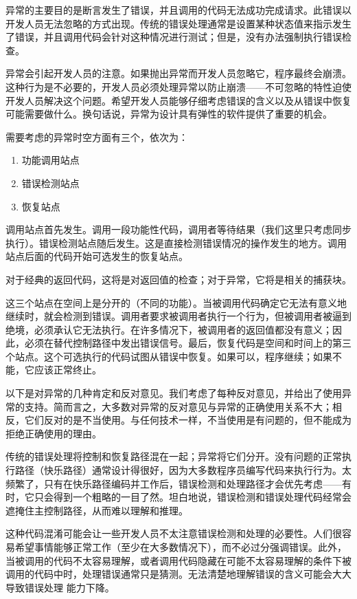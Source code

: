 
异常的主要目的是断言发生了错误，并且调用的代码无法成功完成请求。此错误以开发人员无法忽略的方式出现。传统的错误处理通常是设置某种状态值来指示发生了错误，并且调用代码会针对这种情况进行测试；但是，没有办法强制执行错误检查。

异常会引起开发人员的注意。如果抛出异常而开发人员忽略它，程序最终会崩溃。这种行为是不必要的，开发人员必须处理异常以防止崩溃——不可忽略的特性迫使开发人员解决这个问题。希望开发人员能够仔细考虑错误的含义以及从错误中恢复可能需要做什么。换句话说，异常为设计具有弹性的软件提供了重要的机会。

需要考虑的异常时空方面有三个，依次为：

\begin{enumerate}
\item
功能调用站点

\item
错误检测站点

\item
恢复站点
\end{enumerate}

调用站点首先发生。调用一段功能性代码，调用者等待结果（我们这里只考虑同步执行）。错误检测站点随后发生。这是直接检测错误情况的操作发生的地方。调用站点后面的代码开始可选发生的恢复站点。

对于经典的返回代码，这将是对返回值的检查；对于异常，它将是相关的捕获块。

这三个站点在空间上是分开的（不同的功能）。当被调用代码确定它无法有意义地继续时，就会检测到错误。调用者要求被调用者执行一个行为，但被调用者被逼到绝境，必须承认它无法执行。在许多情况下，被调用者的返回值都没有意义；因此，必须在替代控制路径中发出错误信号。最后，恢复代码是空间和时间上的第三个站点。这个可选执行的代码试图从错误中恢复。如果可以，程序继续；如果不能，它应该正常终止。

以下是对异常的几种肯定和反对意见。我们考虑了每种反对意见，并给出了使用异常的支持。简而言之，大多数对异常的反对意见与异常的正确使用关系不大；相反，它们反对的是不当使用。与任何技术一样，不当使用是有问题的，但不能成为拒绝正确使用的理由。


传统的错误处理将控制和恢复路径混在一起；异常将它们分开。没有问题的正常执行路径（快乐路径）通常设计得很好，因为大多数程序员编写代码来执行行为。太频繁了，只有在快乐路径编码并工作后，错误检测和处理路径才会优先考虑——有时，它只会得到一个粗略的一目了然。坦白地说，错误检测和错误处理代码经常会遮掩住主控制路径，从而难以理解和推理。

这种代码混淆可能会让一些开发人员不太注意错误检测和处理的必要性。人们很容易希望事情能够正常工作（至少在大多数情况下），而不必过分强调错误。此外，当被调用的代码不太容易理解，或者调用代码隐藏在可能不太容易理解的条件下被调用的代码中时，处理错误通常只是猜测。无法清楚地理解错误的含义可能会大大导致错误处理 能力下降。

